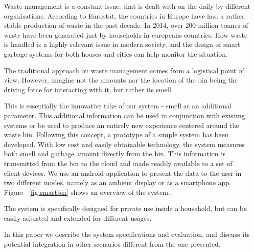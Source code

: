 Waste management is a constant issue, that is dealt with on the daily by different organisations.
According to Eurostat, the countries in Europe have had a rather stable production of waste in the past decade. In 2014, over 200 million tonnes of waste have been generated just by households in europeans countries\cite{eurostat}.
How waste is handled is a highly relevant issue in modern society, and the design of smart garbage systems for both houses and cities can help monitor the situation.

The traditional approach on waste management comes from a logistical point of view.
However, imagine not the amounts nor the location of the bin being the driving force for interacting with it, but rather its smell.

This is essentially the innovative take of our system - smell as an additional parameter.
This additional information can be used in conjunction with existing systems or be used to produce an entirely new experience centered around the waste bin.
Following this concept, a prototype of a simple system has been developed.
With low cost and easily obtainable technology, the system measures both smell and garbage amount directly from the bin.
This information is transmitted from the bin to the cloud and made readily available to a set of client devices.
We use an android application to present the data to the user in two different modes, namely as an ambient display or as a smartphone app.
Figure ~\ref{fig:smartbin} shows an overview of the system.

The system is specifically designed for private use inside a household, but can be easily adjusted and extended for different usages.

In this paper we describe the system specifications and evaluation, and discuss its potential integration in other scenarios different from the one presented.

